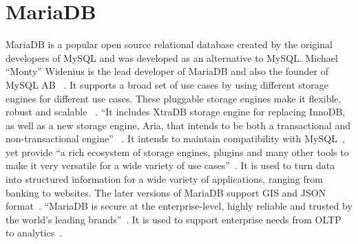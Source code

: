 \section{MariaDB}
 
MariaDB is a popular open source relational database created by the
original developers of MySQL and was developed as an alternative to
MySQL. Michael ``Monty'' Widenius is the lead developer of MariaDB and
also the founder of MySQL AB ~\cite{hid-sp18-516-wiki-mariadb}. It supports a broad
set of use cases by using different storage engines for different use
cases. These pluggable storage engines make it flexible, robust and
scalable ~\cite{hid-sp18-516-mariadb-server}. ``It includes XtraDB storage engine for
replacing InnoDB, as well as a new storage engine, Aria, that intends
to be both a transactional and non-transactional engine''
~\cite{hid-sp18-516-wiki-mariadb}. It intends to maintain compatibility with
MySQL~\cite{hid-sp18-516-wiki-mariadb}, yet provide ``a rich ecosystem of storage
engines, plugins and many other tools to make it very versatile for a
wide variety of use cases''~\cite{hid-sp18-516-mariadb-foundation}. It is used to turn
data into structured information for a wide variety of applications,
ranging from banking to websites. The later versions of MariaDB
support GIS and JSON format~\cite{hid-sp18-516-mariadb-foundation}. ``MariaDB is
secure at the enterprise-level, highly reliable and trusted by the
world's leading brands''~\cite{hid-sp18-516-mariadb}. It is used to support
enterprise needs from OLTP to analytics~\cite{hid-sp18-516-mariadb}.
 

